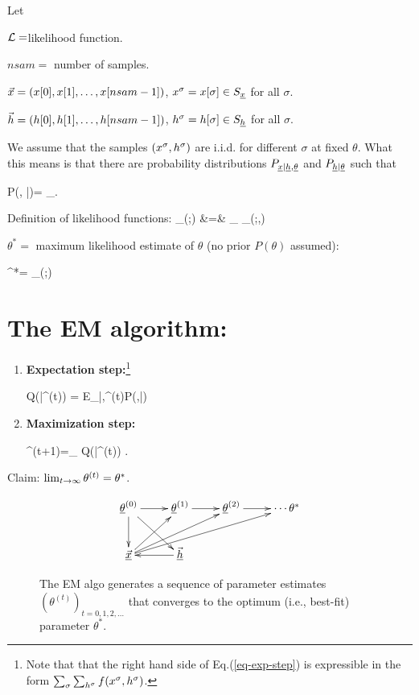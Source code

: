 Let
 
${\cal L}=$likelihood 
function.

$nsam=$ number of samples.

${\vec{x}}=(x[0], x[1], \ldots, x[nsam-1])$,
 $x^\sigma=x[\sigma]\in S_{\underline{x}}$ for all $\sigma$.

${\vec{h}}=(h[0], h[1], \ldots, h[nsam-1])$,
$h^\sigma=h[\sigma]\in S_{\underline{h}}$ for all $\sigma$.

We assume that the samples $(x^\sigma,h^\sigma)$
are i.i.d. for different $\sigma$ at fixed 
$\theta$.
What this means is that 
there are
probability distributions
$P_{{\underline{x}}|{\underline{h}},\underline{\theta}}$
and $P_{{\underline{h}}|\underline{\theta}}$
such that

\beq
P(\vecx, \vech|\theta)=
\prod_\sigma {}
\;.
\eeq

Definition of likelihood functions:
\beqa
{}
_{\call(\theta;\vecx)}
&=&
\sum_{\vech}
_{\call(\theta;\vecx,\vech)}
\eeqa


$\theta^*=$ maximum likelihood
estimate of $\theta$ (no prior $P(\theta)$
assumed):

\beq
\theta^*=
\argmax_\theta\call(\theta;\vecx)
\eeq

\section{The EM algorithm:}
\begin{enumerate}
\item{\bf Expectation step:}\footnote{
Note that
that
the right hand side of
Eq.(\ref{eq-exp-step})
is expressible 
in the form $\sum_\sigma 
\sum_{h^\sigma}f(x^\sigma,
h^\sigma)$.}
 
\beq
Q(\theta|\theta^{(t)})
=
E_{\vech|\vecx,\theta^{(t)}}\ln P(\vecx,\vech|\theta)
\label{eq-exp-step}
\eeq

\item{\bf Maximization step:}

\beq
\theta^{(t+1)}=\argmax_\theta
Q(\theta|\theta^{(t)})
\label{eq-maxi-step}
\;.
\eeq
\end{enumerate}


Claim: $\lim_{t\rightarrow \infty}
\theta^{(t)}=\theta^*$.

\begin{figure}[h!]
$$\xymatrix{
\ul{\theta}^{(0)}\ar[d]\ar[dr]\ar[r]
&\ul{\theta}^{(1)}\ar[r]
&\ul{\theta}^{(2)}\ar[r]
&\cdots\theta^*
\\
\ul{\vecx}\ar[ru]\ar[rru]\ar[urrr]
&\ul{\vech}\ar[l]
}$$
\caption{
The EM algo generates 
a sequence of 
parameter estimates 
$(\theta^{(t)})_{t=0, 1,2, \ldots}$
that converges to the optimum (i.e., 
best-fit) parameter $\theta^*$.
}
\label{fig-emax-dynamical-bnet}
\end{figure}

